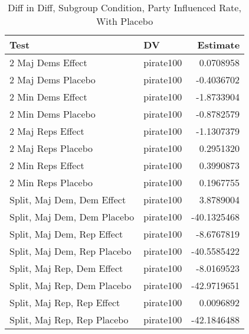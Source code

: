 \documentclass[12pt]{article}
\begin{document}
\begin{table}[H]
	\centering
	\caption{Diff in Diff, Subgroup Condition, Party Influenced Rate, With Placebo}
	\begin{tabular}{llr}
		\hline
		Test & DV & Estimate \\ 
		\hline
		2 Maj Dems Effect & pirate100 & 0.0708958 \\ 
		2 Maj Dems Placebo & pirate100 & -0.4036702 \\ 
		\hline
		2 Min Dems Effect & pirate100 & -1.8733904 \\ 
		2 Min Dems Placebo & pirate100 & -0.8782579 \\ 
		\hline
		2 Maj Reps Effect & pirate100 & -1.1307379 \\ 
		2 Maj Reps Placebo & pirate100 & 0.2951320 \\ 
		\hline
		2 Min Reps Effect & pirate100 & 0.3990873 \\ 
		2 Min Reps Placebo & pirate100 & 0.1967755 \\ 
		\hline
		Split, Maj Dem, Dem Effect & pirate100 & 3.8789004 \\ 
		Split, Maj Dem, Dem Placebo & pirate100 & -40.1325468 \\ 
		\hline
		Split, Maj Dem, Rep Effect & pirate100 & -8.6767819 \\ 
		Split, Maj Dem, Rep Placebo & pirate100 & -40.5585422 \\ 
		\hline
		Split, Maj Rep, Dem Effect & pirate100 & -8.0169523 \\ 
		Split, Maj Rep, Dem Placebo & pirate100 & -42.9719651 \\ 
		\hline
		Split, Maj Rep, Rep Effect & pirate100 & 0.0096892 \\ 
		Split, Maj Rep, Rep Placebo & pirate100 & -42.1846488 \\ 
		\hline
	\end{tabular}
\end{table}
\end{document}
